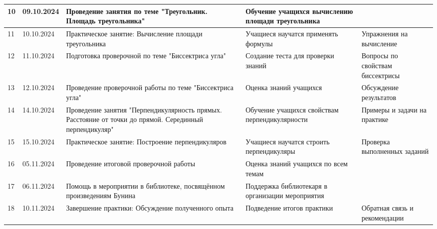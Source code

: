 \documentclass{article}
\begin{document}
\begin{tabular}{|p{1cm}|p{1.5cm}|p{5.5cm}|p{4.5cm}|p{3.5cm}|}
10 & 09.10.2024 & Проведение занятия по теме "Треугольник. Площадь треугольника" & Обучение учащихся вычислению площади треугольника & \\ \hline
11 & 10.10.2024 & Практическое занятие: Вычисление площади треугольника & Учащиеся научатся применять формулы & Упражнения на вычисление \\ \hline
12 & 11.10.2024 & Подготовка проверочной по теме "Биссектриса угла" & Создание теста для проверки знаний & Вопросы по свойствам биссектрисы \\ \hline
13 & 12.10.2024 & Проведение проверочной работы по теме "Биссектриса угла" & Оценка знаний учащихся & Обсуждение результатов \\ \hline
14 & 14.10.2024 & Проведение занятия "Перпендикулярность прямых. Расстояние от точки до прямой. Серединный перпендикуляр" & Обучение учащихся свойствам перпендикулярности & Примеры и задачи на практике \\ \hline
15 & 15.10.2024 & Практическое занятие: Построение перпендикуляров & Учащиеся научатся строить перпендикуляры & Проверка выполненных заданий \\ \hline
16 & 05.11.2024 & Проведение итоговой проверочной работы & Оценка знаний учащихся по всем темам & \\ \hline
17 & 06.11.2024 & Помощь в мероприятии в библиотеке, посвящённом произведениям Бунина & Поддержка библиотекаря в организации мероприятия & \\ \hline
18 & 10.11.2024 & Завершение практики: Обсуждение полученного опыта & Подведение итогов практики & Обратная связь и рекомендации \\ \hline
\end{tabular}
\end{document}
